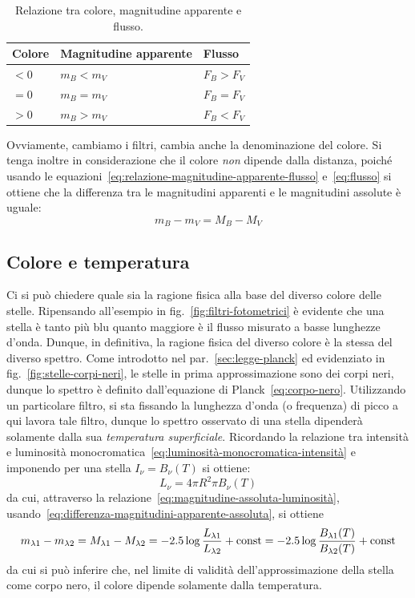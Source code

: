 \begin{table}
\caption{Relazione tra colore, magnitudine apparente e flusso.}
\label{tab:colore}
\centering
\begin{tabular}{lll}
\toprule
Colore & Magnitudine apparente & Flusso \\
\midrule
$<0$ & $m_B < m_V$ & $F_B > F_V$ \\
$=0$ & $m_B = m_V$ & $F_B = F_V$ \\
$>0$ & $m_B > m_V$ & $F_B < F_V$ \\
\bottomrule
\end{tabular}
\end{table}

Ovviamente, cambiamo i filtri, cambia anche la denominazione del colore. Si tenga inoltre in considerazione che il colore \emph{non} dipende dalla distanza, poiché usando le equazioni~\eqref{eq:relazione-magnitudine-apparente-flusso} e~\eqref{eq:flusso} si ottiene che la differenza tra le magnitudini apparenti e le magnitudini assolute è uguale:
\begin{equation}\label{eq:differenza-magnitudini-apparente-assoluta}
    m_B-m_V = M_B-M_V
\end{equation}

\subsection{Colore e temperatura}
Ci si può chiedere quale sia la ragione fisica alla base del diverso colore delle stelle. Ripensando all'esempio in fig.~\ref{fig:filtri-fotometrici} è evidente che una stella è tanto più blu quanto maggiore è il flusso misurato a basse lunghezze d'onda. Dunque, in definitiva, la ragione fisica del diverso colore è la stessa del diverso spettro. Come introdotto nel par.~\ref{sec:legge-planck} ed evidenziato in fig.~\ref{fig:stelle-corpi-neri}, le stelle in prima approssimazione sono dei corpi neri, dunque lo spettro è definito dall'equazione di Planck~\eqref{eq:corpo-nero}. Utilizzando un particolare filtro, si sta fissando la lunghezza d'onda (o frequenza) di picco a qui lavora tale filtro, dunque lo spettro osservato di una stella dipenderà solamente dalla sua \emph{temperatura superficiale}. Ricordando la relazione tra intensità e luminosità monocromatica~\eqref{eq:luminosità-monocromatica-intensità} e imponendo per una stella $I_\nu = B_\nu (T)$ si ottiene:
\[
    L_\nu = 4 \pi R^2 \pi B_\nu (T)
\]
da cui, attraverso la relazione~\eqref{eq:magnitudine-assoluta-luminosità}, usando~\eqref{eq:differenza-magnitudini-apparente-assoluta}, si ottiene
\[
    m_{\lambda 1} - m_{\lambda 2} = M_{\lambda 1} - M_{\lambda 2} = -2.5 \log\frac{L_{\lambda 1}}{L_{\lambda 2}} + \textup{const} = -2.5 \log\frac{B_{\lambda 1}(T)}{B_{\lambda 2}(T)} + \textup{const}
\]
da cui si può inferire che, nel limite di validità dell'approssimazione della stella come corpo nero, il colore dipende solamente dalla temperatura.

